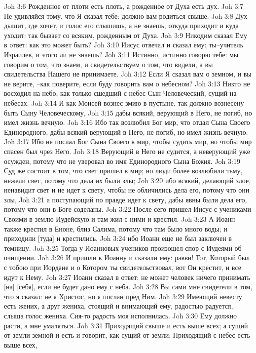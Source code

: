 Joh 3:6  Рожденное от плоти есть плоть, а рожденное от Духа есть дух.
Joh 3:7  Не удивляйся тому, что Я сказал тебе: должно вам родиться свыше.
Joh 3:8  Дух дышит, где хочет, и голос его слышишь, а не знаешь, откуда приходит и куда уходит: так бывает со всяким, рожденным от Духа.
Joh 3:9  Никодим сказал Ему в ответ: как это может быть?
Joh 3:10  Иисус отвечал и сказал ему: ты--учитель Израилев, и этого ли не знаешь?
Joh 3:11  Истинно, истинно говорю тебе: мы говорим о том, что знаем, и свидетельствуем о том, что видели, а вы свидетельства Нашего не принимаете.
Joh 3:12  Если Я сказал вам о земном, и вы не верите, --как поверите, если буду говорить вам о небесном?
Joh 3:13  Никто не восходил на небо, как только сшедший с небес Сын Человеческий, сущий на небесах.
Joh 3:14  И как Моисей вознес змию в пустыне, так должно вознесену быть Сыну Человеческому,
Joh 3:15  дабы всякий, верующий в Него, не погиб, но имел жизнь вечную.
Joh 3:16  Ибо так возлюбил Бог мир, что отдал Сына Своего Единородного, дабы всякий верующий в Него, не погиб, но имел жизнь вечную.
Joh 3:17  Ибо не послал Бог Сына Своего в мир, чтобы судить мир, но чтобы мир спасен был чрез Него.
Joh 3:18  Верующий в Него не судится, а неверующий уже осужден, потому что не уверовал во имя Единородного Сына Божия.
Joh 3:19  Суд же состоит в том, что свет пришел в мир; но люди более возлюбили тьму, нежели свет, потому что дела их были злы;
Joh 3:20  ибо всякий, делающий злое, ненавидит свет и не идет к свету, чтобы не обличились дела его, потому что они злы,
Joh 3:21  а поступающий по правде идет к свету, дабы явны были дела его, потому что они в Боге соделаны.
Joh 3:22  После сего пришел Иисус с учениками Своими в землю Иудейскую и там жил с ними и крестил.
Joh 3:23  А Иоанн также крестил в Еноне, близ Салима, потому что там было много воды; и приходили [туда] и крестились,
Joh 3:24  ибо Иоанн еще не был заключен в темницу.
Joh 3:25  Тогда у Иоанновых учеников произошел спор с Иудеями об очищении.
Joh 3:26  И пришли к Иоанну и сказали ему: равви! Тот, Который был с тобою при Иордане и о Котором ты свидетельствовал, вот Он крестит, и все идут к Нему.
Joh 3:27  Иоанн сказал в ответ: не может человек ничего принимать [на] [себя], если не будет дано ему с неба.
Joh 3:28  Вы сами мне свидетели в том, что я сказал: не я Христос, но я послан пред Ним.
Joh 3:29  Имеющий невесту есть жених, а друг жениха, стоящий и внимающий ему, радостью радуется, слыша голос жениха. Сия-то радость моя исполнилась.
Joh 3:30  Ему должно расти, а мне умаляться.
Joh 3:31  Приходящий свыше и есть выше всех; а сущий от земли земной и есть и говорит, как сущий от земли; Приходящий с небес есть выше всех,
